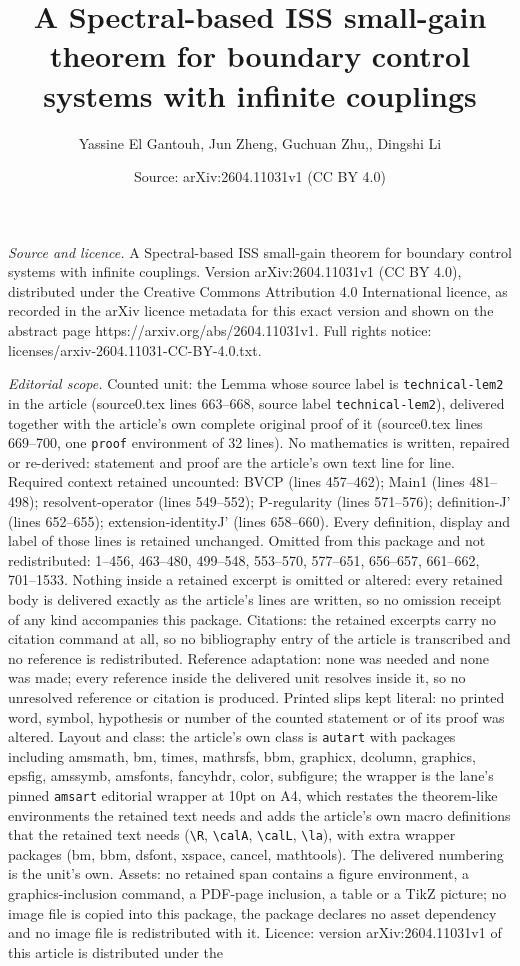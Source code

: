 \documentclass[10pt,a4paper]{amsart}
\title[A Spectral-based ISS small-gain theorem for boundary control]{A Spectral-based ISS small-gain theorem for boundary control systems with infinite couplings}
\author{Yassine El Gantouh, Jun Zheng, Guchuan Zhu,, Dingshi Li}
\date{Source: arXiv:2604.11031v1 (CC BY 4.0)}
\begin{document}
\maketitle

\noindent\emph{Source and licence.} A Spectral-based ISS small-gain theorem for boundary control systems with infinite couplings. Version arXiv:2604.11031v1 (CC BY 4.0), distributed under the Creative Commons Attribution 4.0 International licence, as recorded in the arXiv licence metadata for this exact version and shown on the abstract page https://arxiv.org/abs/2604.11031v1. Full rights notice: licenses/arxiv-2604.11031-CC-BY-4.0.txt.\par\smallskip

\noindent\textit{Editorial scope.} Counted unit: the Lemma whose source label is \texttt{technical-lem2} in the article (source0.tex lines 663--668, source label \texttt{technical-lem2}), delivered together with the article's own complete original proof of it (source0.tex lines 669--700, one \texttt{proof} environment of 32 lines). No mathematics is written, repaired or re-derived: statement and proof are the article's own text line for line. Required context retained uncounted: BVCP (lines 457--462); Main1 (lines 481--498); resolvent-operator (lines 549--552); P-regularity (lines 571--576); definition-J' (lines 652--655); extension-identityJ' (lines 658--660). Every definition, display and label of those lines is retained unchanged. Omitted from this package and not redistributed: 1--456, 463--480, 499--548, 553--570, 577--651, 656--657, 661--662, 701--1533. Nothing inside a retained excerpt is omitted or altered: every retained body is delivered exactly as the article's lines are written, so no omission receipt of any kind accompanies this package. Citations: the retained excerpts carry no citation command at all, so no bibliography entry of the article is transcribed and no reference is redistributed. Reference adaptation: none was needed and none was made; every reference inside the delivered unit resolves inside it, so no unresolved reference or citation is produced. Printed slips kept literal: no printed word, symbol, hypothesis or number of the counted statement or of its proof was altered. Layout and class: the article's own class is \texttt{autart} with packages including amsmath, bm, times, mathrsfs, bbm, graphicx, dcolumn, graphics, epsfig, amssymb, amsfonts, fancyhdr, color, subfigure; the wrapper is the lane's pinned \texttt{amsart} editorial wrapper at 10pt on A4, which restates the theorem-like environments the retained text needs and adds the article's own macro definitions that the retained text needs (\texttt{\textbackslash R}, \texttt{\textbackslash calA}, \texttt{\textbackslash calL}, \texttt{\textbackslash la}), with extra wrapper packages (bm, bbm, dsfont, xspace, cancel, mathtools). The delivered numbering is the unit's own. Assets: no retained span contains a figure environment, a graphics-inclusion command, a PDF-page inclusion, a table or a TikZ picture; no image file is copied into this package, the package declares no asset dependency and no image file is redistributed with it. Licence: version arXiv:2604.11031v1 of this article is distributed under the 
\end{document}
